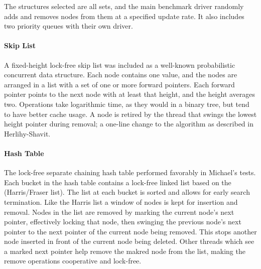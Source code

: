 
The structures selected are all sets, and the main benchmark driver randomly adds and removes nodes from them at a specified update rate.  It also includes two priority queues with their own driver.

\paragraph{Skip List} A fixed-height lock-free skip list was included as a well-known probabilistic concurrent data structure.  Each node contains one value, and the nodes are arranged in a list with a set of one or more forward pointers.  Each forward pointer points to the next node with at least that height, and the height averages two.  Operations take logarithmic time, as they would in a binary tree, but tend to have better cache usage.  A node is retired by the thread that swings the lowest height pointer during removal; a one-line change to the algorithm as described in Herlihy-Shavit.\cite{HSBook}

\paragraph{Hash Table} The lock-free separate chaining hash table performed favorably in Michael's tests.\cite{HashTables} Each bucket in the hash table contains a lock-free linked list based on the (Harris/Fraser list). The list at each bucket is sorted and allows for early search termination. Like the Harris list a window of nodes is kept for insertion and removal. Nodes in the list are removed by marking the current node's next pointer, effectively locking that node, then swinging the previous node's next pointer to the next pointer of the current node being removed. This stops another node inserted in front of the current node being deleted. Other threads which see a marked next pointer help remove the makred node from the list, making the remove operations cooperative and lock-free.


